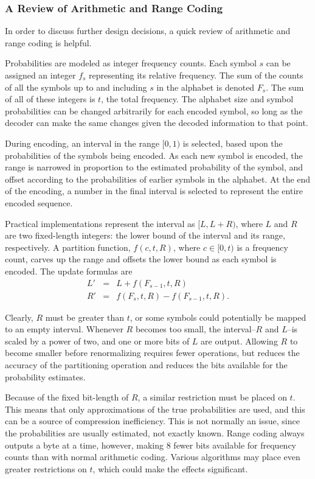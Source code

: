 \documentclass[11pt,letterpaper]{article}
\begin{document}
\subsubsection{A Review of Arithmetic and Range Coding}

In order to discuss further design decisions, a quick review of arithmetic and
 range coding is helpful.

Probabilities are modeled as integer frequency counts.
Each symbol $s$ can be assigned an integer $f_s$ representing its relative
 frequency.
The sum of the counts of all the symbols up to and including $s$ in the
 alphabet is denoted $F_s$.
The sum of all of these integers is $t$, the total frequency.
The alphabet size and symbol probabilities can be changed arbitrarily for each
 encoded symbol, so long as the decoder can make the same changes given the
 decoded information to that point.

During encoding, an interval in the range $[0,1)$ is selected, based upon the
 probabilities of the symbols being encoded.
As each new symbol is encoded, the range is narrowed in proportion to the
 estimated probability of the symbol, and offset according to the probabilities
 of earlier symbols in the alphabet.
At the end of the encoding, a number in the final interval is selected to
 represent the entire encoded sequence.

Practical implementations represent the interval as $[L,L+R)$, where $L$ and
 $R$ are two fixed-length integers: the lower bound of the interval and its
 range, respectively.
A partition function, $f(c,t,R)$, where $c\in[0,t)$ is a frequency count,
 carves up the range and offsets the lower bound as each symbol is encoded.
The update formulas are
\begin{eqnarray*}
L'&=&L+f(F_{s-1},t,R)\\
R'&=&f(F_s,t,R)-f(F_{s-1},t,R).
\end{eqnarray*}

Clearly, $R$ must be greater than $t$, or some symbols could potentially be
 mapped to an empty interval.
Whenever $R$ becomes too small, the interval--$R$ and $L$--is scaled by a power
 of two, and one or more bits of $L$ are output.
Allowing $R$ to become smaller before renormalizing requires fewer operations,
 but reduces the accuracy of the partitioning operation and reduces the bits
 available for the probability estimates.

Because of the fixed bit-length of $R$, a similar restriction must be placed on
 $t$.
This means that only approximations of the true probabilities are used, and
 this can be a source of compression inefficiency.
This is not normally an issue, since the probabilities are usually estimated,
 not exactly known.
Range coding always outputs a byte at a time, however, making 8 fewer bits
 available for frequency counts than with normal arithmetic coding.
Various algorithms may place even greater restrictions on $t$, which could make
 the effects significant.
\end{document}
